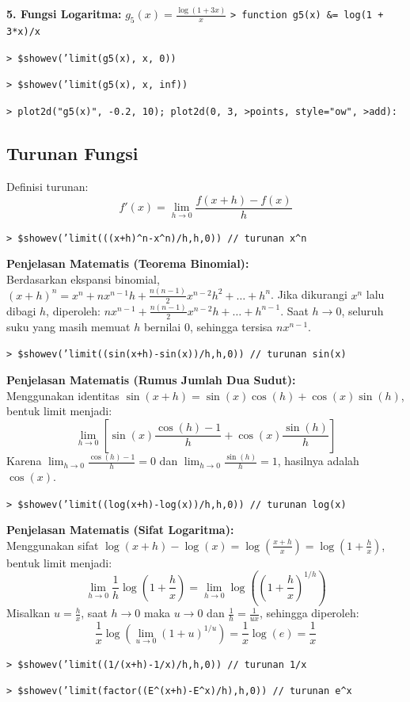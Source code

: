 \documentclass[11pt, a4paper]{article}
\newcommand{\emtcmd}[1]{\noindent\texttt{\textcolor{emtcommand}{>}\ #1}\par\smallskip}
\begin{document}
\textbf{5. Fungsi Logaritma:} $g_5(x) = \frac{\log(1 + 3x)}{x}$
\emtcmd{function g5(x) \&= log(1 + 3*x)/x}
\emtcmd{\$showev('limit(g5(x), x, 0))}
\emtcmd{\$showev('limit(g5(x), x, inf))}
\emtcmd{plot2d("g5(x)", -0.2, 10); plot2d(0, 3, >points, style="ow", >add):}

\subsection*{Turunan Fungsi}

Definisi turunan:
$$f'(x) = \lim_{h \to 0} \frac{f(x+h) - f(x)}{h}$$

\emtcmd{\$showev('limit(((x+h)\^{}n-x\^{}n)/h,h,0)) \textcolor{emtcomment}{// turunan x\^{}n}}

\textbf{Penjelasan Matematis (Teorema Binomial):} \\
Berdasarkan ekspansi binomial, $(x+h)^n = x^n + n x^{n-1} h + \frac{n(n-1)}{2} x^{n-2} h^2 + \dots + h^n$. Jika dikurangi $x^n$ lalu dibagi $h$, diperoleh: $n x^{n-1} + \frac{n(n-1)}{2} x^{n-2} h + \dots + h^{n-1}$. Saat $h \to 0$, seluruh suku yang masih memuat $h$ bernilai $0$, sehingga tersisa $n x^{n-1}$.

\emtcmd{\$showev('limit((sin(x+h)-sin(x))/h,h,0)) \textcolor{emtcomment}{// turunan sin(x)}}

\textbf{Penjelasan Matematis (Rumus Jumlah Dua Sudut):} \\
Menggunakan identitas $\sin(x+h) = \sin(x)\cos(h) + \cos(x)\sin(h)$, bentuk limit menjadi:
$$\lim_{h \to 0} \left[\sin(x)\frac{\cos(h)-1}{h} + \cos(x)\frac{\sin(h)}{h}\right]$$
Karena $\lim_{h \to 0} \frac{\cos(h)-1}{h} = 0$ dan $\lim_{h \to 0} \frac{\sin(h)}{h} = 1$, hasilnya adalah $\cos(x)$.

\emtcmd{\$showev('limit((log(x+h)-log(x))/h,h,0)) \textcolor{emtcomment}{// turunan log(x)}}

\textbf{Penjelasan Matematis (Sifat Logaritma):} \\
Menggunakan sifat $\log(x+h) - \log(x) = \log\left(\frac{x+h}{x}\right) = \log\left(1 + \frac{h}{x}\right)$, bentuk limit menjadi:
$$\lim_{h \to 0} \frac{1}{h}\log\left(1 + \frac{h}{x}\right) = \lim_{h \to 0} \log\left(\left(1 + \frac{h}{x}\right)^{1/h}\right)$$
Misalkan $u = \frac{h}{x}$, saat $h \to 0$ maka $u \to 0$ dan $\frac{1}{h} = \frac{1}{ux}$, sehingga diperoleh:
$$\frac{1}{x}\log\left(\lim_{u \to 0} (1 + u)^{1/u}\right) = \frac{1}{x}\log(e) = \frac{1}{x}$$

\emtcmd{\$showev('limit((1/(x+h)-1/x)/h,h,0)) \textcolor{emtcomment}{// turunan 1/x}}
\emtcmd{\$showev('limit(factor((E\^{}(x+h)-E\^{}x)/h),h,0)) \textcolor{emtcomment}{// turunan e\^{}x}}
\end{document}
